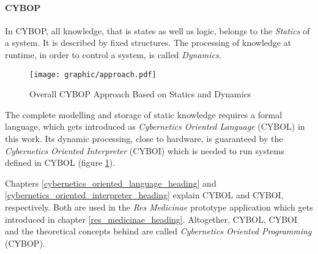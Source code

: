 %
%
%
%
%
%
%

\paragraph{CYBOP}
\label{cybop_approach_heading}

In CYBOP, all knowledge, that is states as well as logic, belongs to the
\emph{Statics} of a system. It is described by fixed structures. The processing
of knowledge at runtime, in order to control a system, is called \emph{Dynamics}.

\begin{figure}[ht]
    \begin{center}
        \texttt{[image: graphic/approach.pdf]}
        \caption{Overall CYBOP Approach Based on Statics and Dynamics}
        \label{cybop_approach_figure}
    \end{center}
\end{figure}

The complete modelling and storage of static knowledge requires a formal
language, which gets introduced as \emph{Cybernetics Oriented Language} (CYBOL)
in this work. Its dynamic processing, close to hardware, is guaranteed by the
\emph{Cybernetics Oriented Interpreter} (CYBOI) which is needed to run systems
defined in CYBOL (figure \ref{cybop_approach_figure}).

Chapters \ref{cybernetics_oriented_language_heading} and
\ref{cybernetics_oriented_interpreter_heading} explain CYBOL and CYBOI,
respectively. Both are used in the \emph{Res Medicinae} prototype application
which gets introduced in chapter \ref{res_medicinae_heading}. Altogether,
CYBOL, CYBOI and the theoretical concepts behind are called
\emph{Cybernetics Oriented Programming} (CYBOP).

